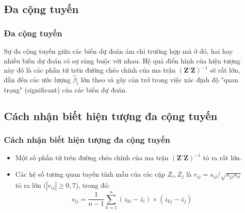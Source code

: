 \begin{footnotesize}
\subsection{Đa cộng tuyến}
\begin{frame}
\frametitle{Đa cộng tuyến}
Sự đa cộng tuyến giữa các biến dự đoán ám chỉ trường hợp mà ở đó, hai hay nhiều biến dự đoán có sự ràng buộc với nhau. Hệ quả điển hình của hiện tượng này đó là các phần tử trên đường chéo chính của ma trận $(\textbf{Z}'\textbf{Z})^{-1}$ sẽ rất lớn, dẫn đến các ước lượng $\widehat{\beta}_i$ lớn theo và gây cản trở trong việc xác định độ "quan trọng" (significant) của các biến dự đoán.
\end{frame}
\subsection{Cách nhận biết hiện tượng đa cộng tuyến}
\begin{frame}
\frametitle{Cách nhận biết hiện tượng đa cộng tuyến}
\begin{itemize}
    \item Một số phần tử trên đường chéo chính của ma trận $(\textbf{Z}'\textbf{Z})^{-1}$ tỏ ra rất lớn.
    \item Các hệ số tương quan tuyến tính mẫu của các cặp $Z_i,Z_j$ là $r_{ij} = s_{ij}/\sqrt{s_{jj}s_{ii}}$ tỏ ra lớn $(|r_{ij}|\geq 0,7$), trong đó:
    $$s_{ij} = \dfrac{1}{n - 1}\sum\limits_{k=1}^n{(z_{ki} - \overline{z_i})  \times (z_{kj} -\overline{z_j})}$$
\end{itemize}
\end{frame}

\end{footnotesize}
